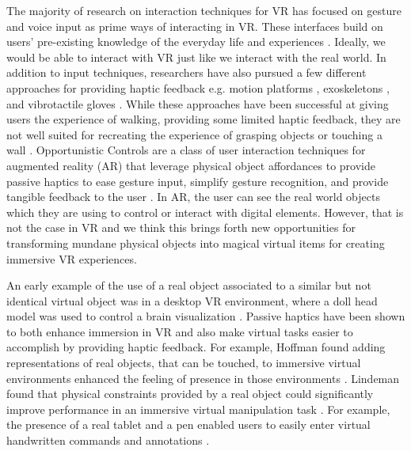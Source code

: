 \documentclass{sigchi}
\begin{document}
The majority of research on interaction techniques for VR has focused on gesture and voice input as prime ways of interacting in VR. These interfaces build on users' pre-existing knowledge of the everyday life and experiences \cite{jacob2008reality}.  Ideally, we would be able to interact with VR just like we interact with the real world. In addition to input techniques, researchers have also pursued a few different approaches for providing haptic feedback e.g. motion platforms \cite{stewart1965platform}, exoskeletons \cite{hale2014handbook}, and vibrotactile gloves \cite{sturman1994survey}. While these approaches have been successful at giving users the experience of walking, providing some limited haptic feedback, they are not well suited for recreating the experience of grasping objects or touching a wall \cite{cheng2015turkdeck}. Opportunistic Controls are a class of user interaction techniques for augmented reality (AR) that leverage physical object affordances to provide passive haptics to ease gesture input, simplify gesture recognition, and provide tangible feedback to the user \cite{henderson2008opportunistic}. In AR, the user can see the real world objects which they are using to control or interact with digital elements. However, that is not the case in VR and we think this brings forth new opportunities for transforming mundane physical objects into magical virtual items for creating immersive VR experiences.

An early example of the use of a real object associated to a similar but not identical virtual object was in a desktop VR environment, where a doll head model was used to control a brain visualization \cite{hinckley1994passive}. Passive haptics have been shown to both enhance immersion in VR and also make virtual tasks easier to accomplish by providing haptic feedback. For example, Hoffman found adding representations of real objects, that can be touched, to immersive virtual environments enhanced the feeling of presence in those environments \cite{hoffman1998physically}. Lindeman found that physical constraints provided by a real object could significantly improve performance in an immersive virtual manipulation task \cite{lindeman1999towards}. For example, the presence of a real tablet and a pen enabled users to easily enter virtual handwritten commands and annotations \cite{poupyrev1998virtual}.  
\end{document}
